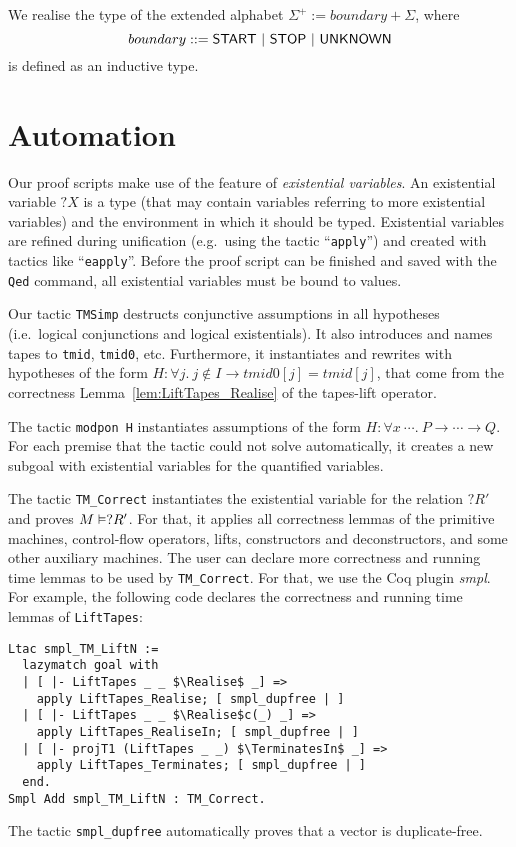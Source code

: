 We realise the type of the extended alphabet $\Sigma^+ := boundary + \Sigma$, where
\[ boundary ::= \mathsf{START} ~|~ \mathsf{STOP} ~|~ \mathsf{UNKNOWN} \]%
is defined as an inductive type.


\section*{Automation}
\label{sec:coq-automation}

Our proof scripts make use of the feature of \textit{existential variables}.  An existential variable $?X$ is a type (that may contain variables
referring to more existential variables) and the environment in which it should be typed.  Existential variables are refined during unification (e.g.\
using the tactic ``\lstinline!apply!'') and created with tactics like ``\lstinline!eapply!''.  Before the proof script can be finished and saved with
the \lstinline!Qed! command, all existential variables must be bound to values.

Our tactic \lstinline!TMSimp! destructs conjunctive assumptions in all hypotheses (i.e.\ logical conjunctions and logical existentials).  It also
introduces and names tapes to \lstinline!tmid!, \lstinline!tmid0!, etc.  Furthermore, it instantiates and rewrites with hypotheses of the form
$H: \forall j.~ j \notin I \rightarrow tmid0[j] = tmid[j]$, that come from the correctness Lemma~\ref{lem:LiftTapes_Realise} of the tapes-lift
operator.

The tactic \lstinline!modpon H! instantiates assumptions of the form $H: \forall x~\cdots.~P \rightarrow \cdots \rightarrow Q$.  For each premise that
the tactic could not solve automatically, it creates a new subgoal with existential variables for the quantified variables.

The tactic \lstinline!TM_Correct! instantiates the existential variable for the relation $?R'$ and proves $M \mathrel{\vDash} ?R'$.  For that, it applies all
correctness lemmas of the primitive machines, control-flow operators, lifts, constructors and deconstructors, and some other auxiliary machines.  The
user can declare more correctness and running time lemmas to be used by \lstinline!TM_Correct!.  For that, we use the Coq plugin \textit{smpl}.  For
example, the following code declares the correctness and running time lemmas of \lstinline!LiftTapes!:

\begin{lstlisting}
Ltac smpl_TM_LiftN :=
  lazymatch goal with
  | [ |- LiftTapes _ _ $\Realise$ _] =>
    apply LiftTapes_Realise; [ smpl_dupfree | ]
  | [ |- LiftTapes _ _ $\Realise$c(_) _] =>
    apply LiftTapes_RealiseIn; [ smpl_dupfree | ]
  | [ |- projT1 (LiftTapes _ _) $\TerminatesIn$ _] =>
    apply LiftTapes_Terminates; [ smpl_dupfree | ]
  end.
Smpl Add smpl_TM_LiftN : TM_Correct.
\end{lstlisting}
The tactic \lstinline!smpl_dupfree! automatically proves that a vector is duplicate-free.

